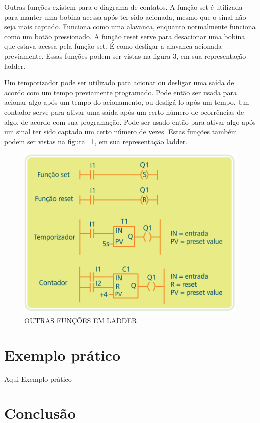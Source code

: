\documentclass{article}
\begin{document}
Outras funções existem para o diagrama de contatos. A função set é utilizada para manter uma bobina acessa após ter sido acionada, mesmo que o sinal não seja mais captado. Funciona como uma alavanca, enquanto normalmente funciona como um botão pressionado. A função reset serve para desacionar uma bobina que estava acessa pela função set. É como desligar a alavanca acionada previamente. Essas funções podem ser vistas na figura 3, em sua representação ladder.  

Um temporizador pode ser utilizado para acionar ou desligar uma saída de acordo com um tempo previamente programado. Pode então ser usada para acionar algo após um tempo do acionamento, ou desligá-lo após um tempo. Um contador serve para ativar uma saída após um certo número de ocorrências de algo, de acordo com sua programação. Pode ser usado então para ativar algo após um sinal ter sido captado um certo número de vezes. Estas funções também podem ser vistas na figura ~\ref{fig:funcoes}, em sua representação ladder.

\begin{figure}[h]
    \centering
    \includegraphics[width=\textwidth]{imagens/funcextras.png}
    \caption{OUTRAS FUNÇÕES EM LADDER}
    \label{fig:funcoes}
\end{figure}


\section{Exemplo prático}
Aqui Exemplo prático

\section{Conclusão}
\end{document}
